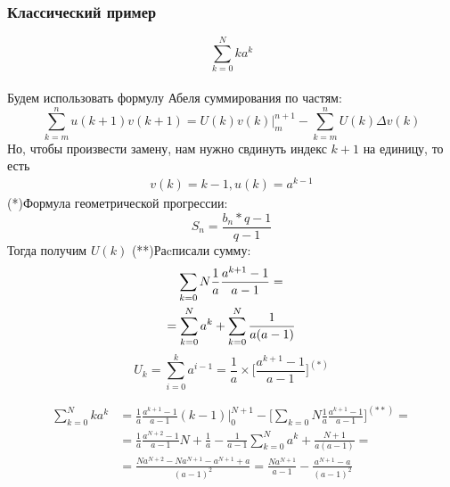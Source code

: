 \documentclass[a4paper,11pt]{article}
\begin{document}
  \subsubsection{Классический пример}
    \[\sum_{k=0}^N ka^k\] \\
    Будем использовать формулу Абеля суммирования по частям: \\
    \[\sum_{k=m}^{n} u(k+1) v(k+1) = U(k) v(k) \bigg|_{m}^{n+1} - \sum_{k=m}^{n} U(k) \Delta v(k)\]
    Но, чтобы произвести замену, нам нужно свдинуть индекс $k+1$ на единицу, то есть \\
    \begin{equation*}
      \begin{split}
      v(k) = k - 1,
      u(k) = a^{k-1}
      \end{split}
    \end{equation*}
    \marginpar
    {
      \footnotesize (*)Формула геометрической прогрессии:
      \footnotesize \[S_n = \frac{b_n*q-1}{q-1}\]
    }
    Тогда получим $U(k)$
    \marginpar
    {
      \footnotesize (**)Раcписали сумму:
      \begin{gather*}
        \footnotesize \sum_{k=0}{N} \frac{1}{a} \frac{a^{k+1}-1}{a-1} = \\
        = \sum_{k=0}^{N}a^k + \sum_{k=0}^{N}\frac{1}{a(a-1)}
      \end{gather*}
    }
    \[U_k = \sum_{i=0}^{k}a^{i-1} = \frac{1}{a} \times \bigg[ \frac{a^{k+1}-1}{a-1} \bigg]^{(*)}\]

    \begin{equation*}
      \begin{split}
        \sum_{k=0}^{N}ka^k & = \frac{1}{a} \frac{a^{k+1}-1}{a-1}(k-1) \bigg|_{0}^{N+1} - \bigg[\sum_{k=0}{N} \frac{1}{a} \frac{a^{k+1}-1}{a-1} \bigg]^{(**)} = \\
        & = \frac{1}{a} \frac{a^{N+2}-1}{a-1}N + \frac{1}{a} - \frac{1}{a-1} \sum_{k=0}^{N}a^k + \frac{N+1}{a(a-1)} = \\
        & = \frac{Na^{N+2} - Na^{N+1} - a^{N+1} + a}{(a-1)^2} = \frac{Na^{N+1}}{a-1} - \frac{a^{N+1} - a}{(a-1)^2}
      \end{split}
    \end{equation*}
\end{document}
